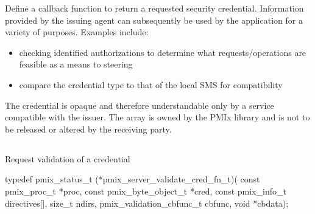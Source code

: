\begin{arglist}
\end{arglist}

\descr

Define a callback function to return a requested security credential. Information provided by the issuing agent can subsequently be used
by the application for a variety of purposes. Examples include:

\begin{itemize}
    \item checking identified authorizations to determine what requests/operations are feasible as a means to steering 
    \item compare the credential type to that of the local SMS for compatibility
\end{itemize}

\adviceuserstart
The credential is opaque and therefore understandable only by a service compatible with the issuer. The  array is owned by the \ac{PMIx} library and is not to be released or altered by the receiving party.
\adviceuserend


\subsection{}

\summary

Request validation of a credential

\format

\cspecificstart
\begin{codepar}
typedef pmix_status_t (*pmix_server_validate_cred_fn_t)(
                             const pmix_proc_t *proc,
                             const pmix_byte_object_t *cred,
                             const pmix_info_t directives[],
                             size_t ndirs,
                             pmix_validation_cbfunc_t cbfunc,
                             void *cbdata);
\end{codepar}
\cspecificend

